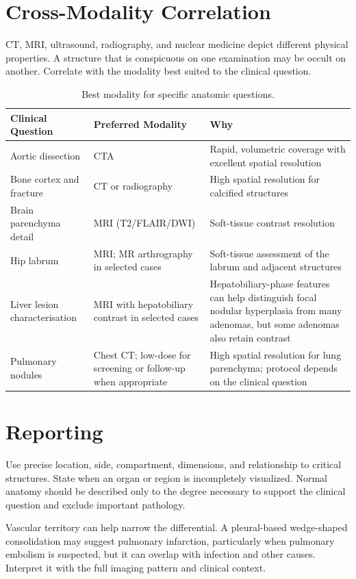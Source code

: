 \section{Cross-Modality Correlation}
CT, MRI, ultrasound, radiography, and nuclear medicine depict different physical properties. A structure that is conspicuous on one examination may be occult on another. Correlate with the modality best suited to the clinical question.

\begin{table}[h]
\centering
\caption{Best modality for specific anatomic questions.}
\label{tab:anatomy_modality}
\begin{tabular}{p{5cm} p{4cm} p{4.5cm}}
\toprule
\textbf{Clinical Question} & \textbf{Preferred Modality} & \textbf{Why} \\
\midrule
Aortic dissection & CTA & Rapid, volumetric coverage with excellent spatial resolution \\
Bone cortex and fracture & CT or radiography & High spatial resolution for calcified structures \\
Brain parenchyma detail & MRI (T2/FLAIR/DWI) & Soft-tissue contrast resolution \\
Hip labrum & MRI; MR arthrography in selected cases & Soft-tissue assessment of the labrum and adjacent structures \\
Liver lesion characterisation & MRI with hepatobiliary contrast in selected cases & Hepatobiliary-phase features can help distinguish focal nodular hyperplasia from many adenomas, but some adenomas also retain contrast \\
Pulmonary nodules & Chest CT; low-dose for screening or follow-up when appropriate & High spatial resolution for lung parenchyma; protocol depends on the clinical question \\
\bottomrule
\end{tabular}
\end{table}

\section{Reporting}
Use precise location, side, compartment, dimensions, and relationship to critical structures. State when an organ or region is incompletely visualized. Normal anatomy should be described only to the degree necessary to support the clinical question and exclude important pathology.

\begin{pearlbox}
Vascular territory can help narrow the differential. A pleural-based wedge-shaped consolidation may suggest pulmonary infarction, particularly when pulmonary embolism is suspected, but it can overlap with infection and other causes. Interpret it with the full imaging pattern and clinical context.
\end{pearlbox}

\clearpage
